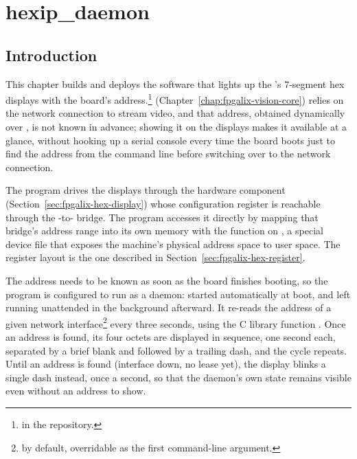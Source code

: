 \chapter{hexip\_daemon}
\label{chap:fpgalix-hexip-daemon}

\section{Introduction}

This chapter builds and deploys the software that lights up the 's 7-segment hex displays with the board's  address.\footnote{ in the repository.}  (Chapter~\ref{chap:fpgalix-vision-core}) relies on the network connection to stream video, and that address, obtained dynamically over , is not known in advance; showing it on the displays makes it available at a glance, without hooking up a serial console every time the board boots just to find the address from the command line before switching over to the network connection.

The program drives the displays through the  hardware component (Section~\ref{sec:fpgalix-hex-display}) whose configuration register is reachable through the -to- bridge. The program accesses it directly by mapping that bridge's address range into its own memory with the  function on , a special  device file that exposes the machine's physical address space to user space. The register layout is the one described in Section~\ref{sec:fpgalix-hex-register}.

The  address needs to be known as soon as the board finishes booting, so the program is configured to run as a daemon: started automatically at boot, and left running unattended in the background afterward. It re-reads the address of a given network interface\footnote{ by default, overridable as the first command-line argument.} every three seconds, using the C library function . Once an  address is found, its four octets are displayed in sequence, one second each, separated by a brief blank and followed by a trailing dash, and the cycle repeats. Until an  address is found (interface down, no  lease yet), the display blinks a single dash instead, once a second, so that the daemon's own state remains visible even without an address to show.

